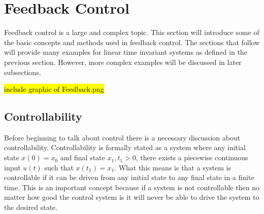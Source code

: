\section{Feedback Control}\label{s:control_systems}

Feedback control is a large and complex topic. This section will
introduce some of the basic concepts and methods used in feedback
control. The sections that follow will provide many examples for linear time invariant systems as defined in the previous section. However, more complex examples will be discussed in later subsections. 

\hl{include graphic of Feedback.png}

\subsection{Controllability}

Before beginning to talk about control there is a necessary discussion about controllability. Controllability is formally stated as a system where any initial state $x(0)=x_0$ and final state $x_1,t_1>0$, there exists a piecewise continuous input $u(t)$ such that $x(t_1)=x_1$. What this means is that a system is controllable if it can be driven from any initial state to any final state in a finite time. This is an important concept because if a system is not controllable then no matter how good the control system is it will never be able to drive the system to the desired state.

